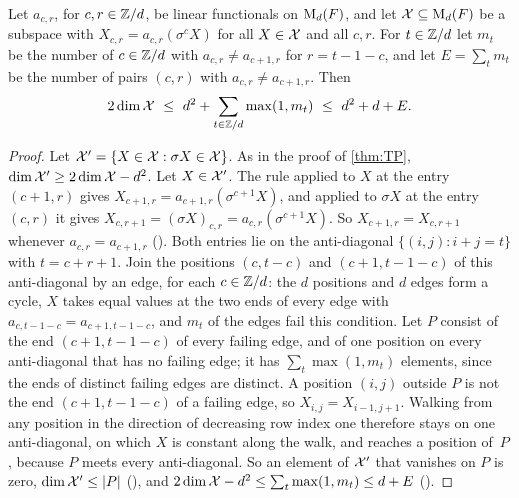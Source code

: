 \begin{proposition}\label{prop:entry}
Let $a_{c,r}$, for $c,r\in\mathbb{Z}/d$, be linear functionals on $\mathrm{M}_d(F)$, and let $\mathcal{X}\subseteq\mathrm{M}_d(F)$ be a subspace
with $X_{c,r}=a_{c,r}(\sigma^cX)$ for all $X\in\mathcal{X}$ and all $c,r$. For $t\in\mathbb{Z}/d$ let $m_t$ be the number of
$c\in\mathbb{Z}/d$ with $a_{c,r}\ne a_{c+1,r}$ for $r=t-1-c$, and let $E=\sum_tm_t$ be the number of pairs $(c,r)$ with
$a_{c,r}\ne a_{c+1,r}$. Then
\[
  2\dim\X\ \le\ d^2+\sum_{t\in\Z/d}\max(1,m_t)\ \le\ d^2+d+E .
\]
\end{proposition}

\begin{proof}
Let $\mathcal{X}'=\{X\in\mathcal{X}:\sigma X\in\mathcal{X}\}$. As in the proof of \cref{thm:TP}, $\dim\mathcal{X}'\ge2\dim\mathcal{X}-d^2$. Let $X\in\mathcal{X}'$. The rule
applied to $X$ at the entry $(c+1,r)$ gives $X_{c+1,r}=a_{c+1,r}(\sigma^{c+1}X)$, and applied to $\sigma X$ at the
entry $(c,r)$ it gives $X_{c,r+1}=(\sigma X)_{c,r}=a_{c,r}(\sigma^{c+1}X)$. So $X_{c+1,r}=X_{c,r+1}$ whenever
$a_{c,r}=a_{c+1,r}$ (). Both entries lie on the anti-diagonal $\{(i,j):i+j=t\}$
with $t=c+r+1$. Join the positions $(c,t-c)$ and $(c+1,t-1-c)$ of this anti-diagonal by an edge, for each $c\in\mathbb{Z}/d$:
the $d$ positions and $d$ edges form a cycle, $X$ takes equal values at the two ends of every edge with
$a_{c,t-1-c}=a_{c+1,t-1-c}$, and $m_t$ of the edges fail this condition. Let $P$ consist of the end $(c+1,t-1-c)$ of
every failing edge, and of one position on every anti-diagonal that has no failing edge; it has
$\sum_t\max(1,m_t)$ elements, since the ends of distinct failing edges are distinct. A position $(i,j)$ outside $P$ is
not the end $(c+1,t-1-c)$ of a failing edge, so $X_{i,j}=X_{i-1,j+1}$. Walking from any position in the direction of
decreasing row index one therefore stays on one anti-diagonal, on which $X$ is constant along the walk, and reaches
a position of~$P$, because $P$ meets every anti-diagonal. So an element of $\mathcal{X}'$ that vanishes on
$P$ is zero, $\dim\mathcal{X}'\le\lvert P \rvert$ (), and
$2\dim\mathcal{X}-d^2\le\sum_t\max(1,m_t)\le d+E$ ().
\end{proof}

